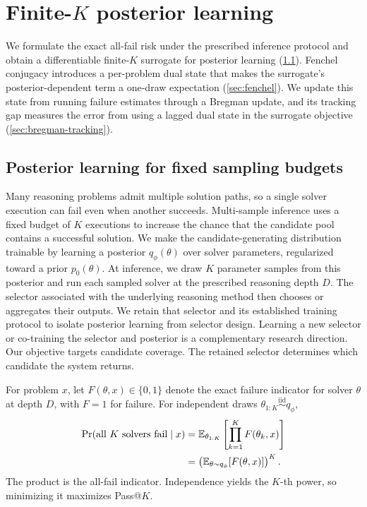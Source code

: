 \section{Finite-\texorpdfstring{$K$}{K} posterior learning}
\label{sec:finite-k}

We formulate the exact all-fail risk under the prescribed inference protocol and obtain a differentiable finite-$K$ surrogate for posterior learning (\cref{sec:problem-setting}).
Fenchel conjugacy introduces a per-problem dual state that makes the surrogate's posterior-dependent term a one-draw expectation (\cref{sec:fenchel}).
We update this state from running failure estimates through a Bregman update, and its tracking gap measures the error from using a lagged dual state in the surrogate objective (\cref{sec:bregman-tracking}).

\subsection{Posterior learning for fixed sampling budgets}
\label{sec:problem-setting}

Many reasoning problems admit multiple solution paths, so a single solver execution can fail even when another succeeds.
Multi-sample inference uses a fixed budget of $K$ executions to increase the chance that the candidate pool contains a successful solution.
We make the candidate-generating distribution trainable by learning a posterior $q_\phi(\theta)$ over solver parameters, regularized toward a prior $p_0(\theta)$.
At inference, we draw $K$ parameter samples from this posterior and run each sampled solver at the prescribed reasoning depth $D$.
The selector associated with the underlying reasoning method then chooses or aggregates their outputs.
We retain that selector and its established training protocol to isolate posterior learning from selector design.
Learning a new selector or co-training the selector and posterior is a complementary research direction.
Our objective targets candidate coverage.
The retained selector determines which candidate the system returns.

For problem $x$, let $F(\theta,x)\in\{0,1\}$ denote the exact failure indicator for solver $\theta$ at depth $D$, with $F=1$ for failure.
For independent draws $\theta_{1:K}\overset{\mathrm{iid}}{\sim}q_\phi$,
\begin{align}
  \Pr(\text{all $K$ solvers fail}\mid x)
  & =
  \mathbb E_{\theta_{1:K}}
  \left[
    \prod_{k=1}^K F(\theta_k,x)
  \right]
  \notag\\
  & =
  \left(
    \mathbb E_{\theta\sim q_\phi}[F(\theta,x)]
  \right)^K.
  \label{eq:binary-all-fail}
\end{align}
The product is the all-fail indicator.
Independence yields the $K$-th power, so minimizing it maximizes Pass@$K$.

